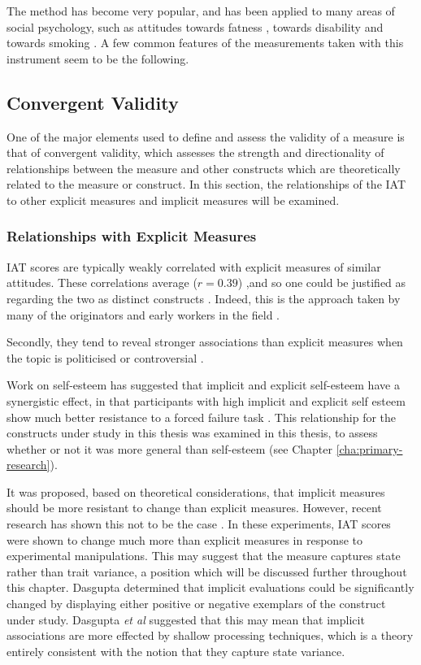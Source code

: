 The method has become very popular, and has been applied to many areas of social psychology, such as attitudes towards fatness \cite{Ahern2008}, towards disability \cite{Pruett2006} and towards smoking \cite{Kahler2007}. A few common features of the measurements taken with this instrument seem to be the following. 

\subsection{Convergent Validity}
\label{sec:convergent-validity}

One of the major elements used to define and assess the validity of a measure is that of convergent validity, which assesses the strength and directionality of relationships between the measure and other constructs which are theoretically related to the measure or construct. In this section, the relationships of the IAT to other explicit measures and implicit measures will be examined. 


\subsubsection{Relationships with Explicit Measures}
\label{sec:relat-with-expl}



IAT scores are typically weakly correlated with explicit measures of similar attitudes. These correlations average ($r=0.39$) \cite{Nosek2005},and so one could be justified as regarding the two as distinct constructs \cite{Nosek2007a}. Indeed, this is the approach taken by many of the originators and early workers in the field \cite{Greenwald2000,Nosek2007a}. 

Secondly, they tend to reveal stronger associations than explicit measures when the topic is politicised or controversial \cite{Greenwald2009}. 

Work on self-esteem has suggested that implicit and explicit self-esteem have a synergistic effect, in that participants with high implicit and explicit self esteem show much better resistance to a forced failure task \cite{Meagher2004}. This relationship for the constructs under study in  this thesis was examined in this thesis, to assess whether or not it was more general than self-esteem (see Chapter \ref{cha:primary-research}). 

It was proposed, based on theoretical considerations, that implicit measures should be more resistant to change than explicit measures. However, recent research has shown this not to be the case \cite{Meagher2004,Gschwendner2008}. In these experiments, IAT scores were shown to change much more than explicit measures in response to experimental manipulations. This may suggest that the measure captures state rather than trait variance, a position which will be discussed further throughout this chapter. Dasgupta \cite{Dasgupta2001} determined that implicit evaluations could be significantly changed by displaying either positive or negative exemplars of the construct under study. Dasgupta \textit{et al} suggested that this may mean that implicit associations are more effected by shallow processing techniques, which is a theory entirely consistent with the notion that they capture state variance. 

